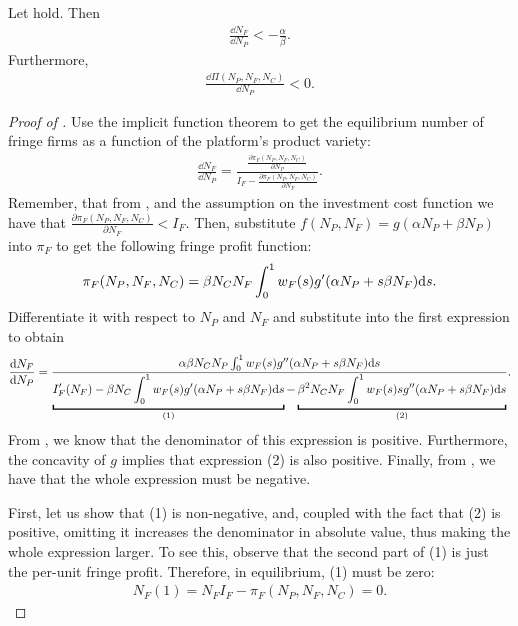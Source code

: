 \begin{proposition}
    \label{prop:aggregate_size_additive}
    Let  hold.
    Then
    \begin{align*}
        \frac{\dd N_F}{\dd N_P} < -\frac{\alpha}{\beta}.
    \end{align*}
    Furthermore,
    \begin{align*}
        \frac{\dd \Pi(N_P, N_F, N_C)}{\dd N_P} < 0.
    \end{align*}
\end{proposition}
\begin{proof}[Proof of ]
    Use the implicit function theorem to get the equilibrium number of fringe firms as a function of the platform's product variety:
    \begin{align*}
        \frac{\dd N_F}{\dd N_P} = \frac{\frac{\partial \pi_F(N_P, N_F, N_C)}{\partial N_P}}{I_F - \frac{\partial \pi_F (N_P, N_F, N_C)}{\partial N_F}}.
    \end{align*}
    Remember, that from , and the assumption on the investment cost function we have that $\frac{\partial \pi_F (N_P, N_F, N_C)}{\partial N_F} < I_F$.
    Then, substitute $f(N_P, N_F) = g(\alpha N_P + \beta N_P)$ into $\pi_F$ to get the following fringe profit function:
    \begin{align*}
        \pi_F(N_P, N_F, N_C) = \beta N_C N_F \int_0^1 w_F(s) g'(\alpha N_P + s \beta N_F) \mathrm{d}s.
    \end{align*}
    Differentiate it with respect to $N_P$ and $N_F$ and substitute into the first expression to obtain
    \begin{align*}
        \frac{\dd N_F}{\dd N_P} = \frac{
            \alpha \beta N_C N_P \int_0^1 w_F(s) g''(\alpha N_P + s \beta N_F) \ds
        }{
            \underbracket{I'_F(N_F) - \beta N_C \int_0^1 w_F(s) g'(\alpha N_P + s \beta N_F) \ds}_{(1)} - \underbracket{\beta^2 N_C N_F \int_0^1 w_F(s) s g''(\alpha N_P + s \beta N_F) \ds}_{(2)}
        }.
    \end{align*}
    From , we know that the denominator of this expression is positive.
    Furthermore, the concavity of $g$ implies that expression (2) is also positive.
    Finally, from , we have that the whole expression must be negative.

    First, let us show that (1) is non-negative, and, coupled with the fact that (2) is positive, omitting it increases the denominator in absolute value, thus making the whole expression larger.
    To see this, observe that the second part of (1) is just the per-unit fringe profit.
    Therefore, in equilibrium, (1) must be zero:
    \begin{align*}
        N_F (1) = N_F I_F - \pi_F(N_P, N_F, N_C) = 0.
    \end{align*}


\end{proof}
